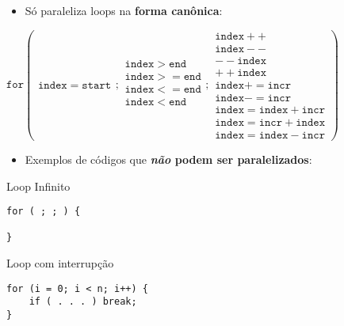 \begin{frame}[fragile]
	\begin{itemize}
		\item Só paraleliza loops na {\bf forma canônica}:
	\end{itemize}
$
\mathtt{for} \left(
		\begin{array}{c}
			\mathtt{index = start}
		\end{array}
		;
		\begin{array}{c}
			\mathtt{index > end} \\
			\mathtt{index >= end} \\
			\mathtt{index <= end} \\
			\mathtt{index < end} \\
		\end{array}
		;
		\begin{array}{c}
			\mathtt{index++} \\
			\mathtt{index--} \\
			\mathtt{--index} \\
			\mathtt{++index} \\
			\mathtt{index += incr} \\
			\mathtt{index -= incr} \\
			\mathtt{index = index + incr} \\
			\mathtt{index = incr + index} \\
			\mathtt{index = index - incr} 
		\end{array}
	\right)
$
			\\[1.2cm]
			\pause

	\begin{itemize}
		\item Exemplos de códigos que {\bf \textit{não} podem ser paralelizados}:
	\end{itemize}

	\begin{multicols}{2}
		Loop Infinito
		\begin{lstlisting}
for ( ; ; ) {

}
		\end{lstlisting}

	\columnbreak
		Loop com interrupção
		\begin{lstlisting}
for (i = 0; i < n; i++) {
	if ( . . . ) break;
}
		\end{lstlisting}	

	\end{multicols}
\end{frame}


